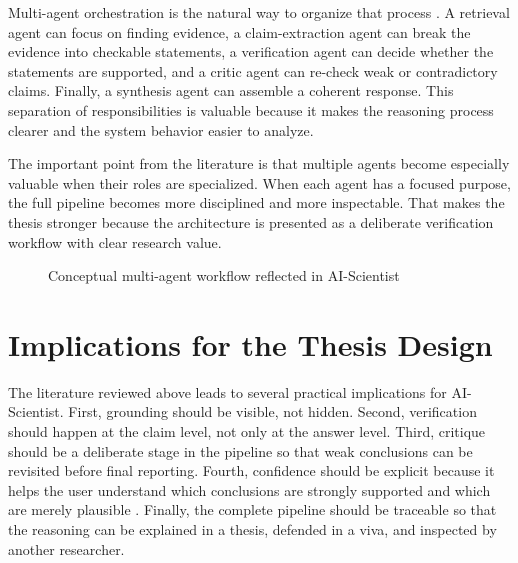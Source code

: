 Multi-agent orchestration is the natural way to organize that process \cite{wu2023autogen,li2023camel,du2023debate}. A retrieval agent can focus on finding evidence, a claim-extraction agent can break the evidence into checkable statements, a verification agent can decide whether the statements are supported, and a critic agent can re-check weak or contradictory claims. Finally, a synthesis agent can assemble a coherent response. This separation of responsibilities is valuable because it makes the reasoning process clearer and the system behavior easier to analyze.

The important point from the literature is that multiple agents become especially valuable when their roles are specialized. When each agent has a focused purpose, the full pipeline becomes more disciplined and more inspectable. That makes the thesis stronger because the architecture is presented as a deliberate verification workflow with clear research value.

\begin{figure}[H]
\centering
{}
\caption{Conceptual multi-agent workflow reflected in AI-Scientist}
\label{fig:multi_agent_workflow}
\end{figure}

\section{Implications for the Thesis Design}

The literature reviewed above leads to several practical implications for AI-Scientist. First, grounding should be visible, not hidden. Second, verification should happen at the claim level, not only at the answer level. Third, critique should be a deliberate stage in the pipeline so that weak conclusions can be revisited before final reporting. Fourth, confidence should be explicit because it helps the user understand which conclusions are strongly supported and which are merely plausible \cite{kadavath2022language,lin2021truthfulqa}. Finally, the complete pipeline should be traceable so that the reasoning can be explained in a thesis, defended in a viva, and inspected by another researcher.

